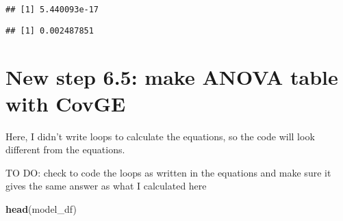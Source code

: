 \documentclass[]{article}
\newenvironment{Shaded}{\begin{snugshade}}{\end{snugshade}}
\newcommand{\KeywordTok}[1]{\textcolor[rgb]{0.13,0.29,0.53}{\textbf{#1}}}
\newcommand{\NormalTok}[1]{#1}
\newcommand{\OperatorTok}[1]{\textcolor[rgb]{0.81,0.36,0.00}{\textbf{#1}}}
\newcommand{\StringTok}[1]{\textcolor[rgb]{0.31,0.60,0.02}{#1}}
\begin{document}
\begin{verbatim}
## [1] 5.440093e-17
\end{verbatim}

\begin{Shaded}
\end{Shaded}

\begin{verbatim}
## [1] 0.002487851
\end{verbatim}

\hypertarget{new-step-6.5-make-anova-table-with-covge}{%
\section{New step 6.5: make ANOVA table with
CovGE}\label{new-step-6.5-make-anova-table-with-covge}}

Here, I didn't write loops to calculate the equations, so the code will
look different from the equations.

TO DO: check to code the loops as written in the equations and make sure
it gives the same answer as what I calculated here

\begin{Shaded}
\begin{Highlighting}[]
\KeywordTok{head}\NormalTok{(model_df)}
\end{Highlighting}
\end{Shaded}
\end{document}
